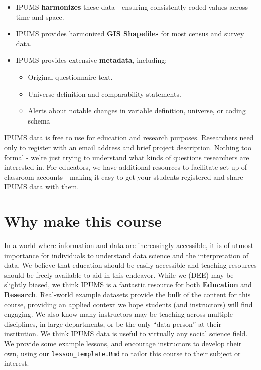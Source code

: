 \documentclass[
]{book}
\providecommand{\tightlist}{%
  \setlength{\itemsep}{0pt}\setlength{\parskip}{0pt}}
\begin{document}
\begin{itemize}
\tightlist
\item
  IPUMS \textbf{harmonizes} these data - ensuring consistently coded values across time and space.
\item
  IPUMS provides harmonized \textbf{GIS Shapefiles} for most census and survey data.
\item
  IPUMS provides extensive \textbf{metadata}, including:

  \begin{itemize}
  \tightlist
  \item
    Original questionnaire text.
  \item
    Universe definition and comparability statements.
  \item
    Alerts about notable changes in variable definition,
    universe, or coding schema
  \end{itemize}
\end{itemize}

IPUMS data is free to use for education and research purposes. Researchers need
only to register with an email address and brief project description. Nothing
too formal - we're just trying to understand what kinds of questions
researchers are interested in. For educators, we have additional resources
to facilitate set up of classroom accounts - making it easy to get your
students registered and share IPUMS data with them.

\hypertarget{why-make-this-course}{%
\section*{Why make this course}\label{why-make-this-course}}

In a world where information and data are increasingly accessible, it is of utmost importance for individuals to understand data science and the interpretation of data. We believe that education should be easily accessible and teaching resources should be freely available to aid in this endeavor. While we (DEE) may be slightly biased, we think IPUMS is a fantastic resource for both \textbf{Education} and \textbf{Research}. Real-world example datasets provide the bulk of the content for this course, providing an applied context we hope students (and instructors) will find engaging. We also know many instructors may be teaching across multiple disciplines, in large departments, or be the only ``data person'' at their institution. We think IPUMS data is useful to virtually any social science field. We provide some example lessons, and encourage instructors to develop their own, using our \texttt{lesson\_template.Rmd} to tailor this course to their subject or interest.
\end{document}
